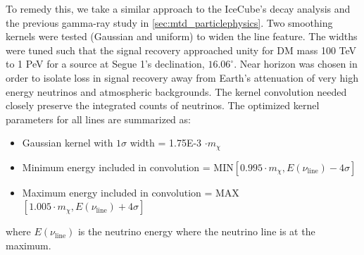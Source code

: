 To remedy this, we take a similar approach to the IceCube's decay analysis \cite{Minjin_icrc23} and the previous gamma-ray study in \cref{sec:mtd_particlephysics}.
Two smoothing kernels were tested (Gaussian and uniform) to widen the line feature.
The widths were tuned such that the signal recovery approached unity for DM mass 100 TeV to 1 PeV for a source at Segue 1's declination, $16.06^\circ$.
Near horizon was chosen in order to isolate loss in signal recovery away from Earth's attenuation of very high energy neutrinos and atmospheric backgrounds.
The kernel convolution needed closely preserve the integrated counts of neutrinos.
The optimized kernel parameters for all lines are summarized as:
\begin{itemize}
    \item Gaussian kernel with $1 \sigma$ width = 1.75E-3 $\cdot m_\chi$
    \item Minimum energy included in convolution = MIN$[0.995 \cdot m_\chi, E(\nu_\mathrm{line}) -4\sigma]$
    \item Maximum energy included in convolution = MAX$[1.005 \cdot m_\chi, E(\nu_\mathrm{line}) +4\sigma]$
\end{itemize}
where $E(\nu_{\mathrm{line}})$ is the neutrino energy where the neutrino line is at the maximum.

